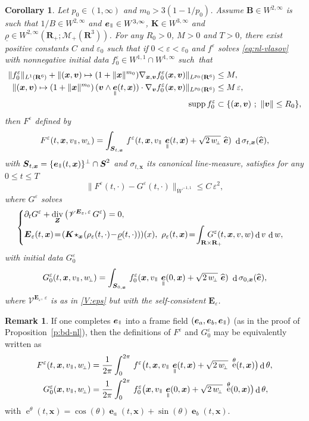 \documentclass[10pt]{amsart}
\let\mathcal\mathscr
\newenvironment{splitcases}
{\begin{cases}\begin{aligned}}
{\end{aligned}\end{cases}}
\newcommand{\sperp}{{\scriptscriptstyle\perp}}
\newcommand{\sep}{\ ;\ }
\let\eps\varepsilon
\let\d\partial
\DeclareMathOperator\dD{d}\let\dd\dD
\DeclareMathOperator\eD{e}
\DeclareMathOperator{\Div}{div}
\theoremstyle{plain}
\newtheorem{corollary}[theorem]{Corollary}
\theoremstyle{definition}
\newtheorem{remark}[theorem]{Remark}
\newcommand\br{\begin{remark}}
\newcommand\er{\end{remark}}
\newcommand{\be}{\begin{equation}}
\newcommand{\ee}{\end{equation}}
\newcommand{\bc}{\begin{corollary}}
\newcommand{\ec}{\end{corollary}}
\newcommand\R{\mathbf R}
\newcommand\bB{{\boldsymbol B}}
\newcommand\bE{{\boldsymbol E}}
\newcommand\bK{{\boldsymbol K}}
\newcommand\bS{{\boldsymbol S}}
\newcommand\bfv{{\boldsymbol v}}
\newcommand\bfx{{\boldsymbol x}}
\newcommand\bfZ{{\boldsymbol Z}}
\newcommand\urho{{\underline \rho}}
\newcommand\cM{{\mathcal M}}
\newcommand\cV{{\mathcal V}}
\DeclareMathOperator{\beD}{\boldsymbol{e}}
\newcommand\eDpar{\beD_\mypar}
\newcommand\eDa{\beD_a}
\newcommand\eDb{\beD_b}
\newcommand\eperp{w_{\!\sperp}}
\newcommand{\mypar}{{\mkern3mu\vphantom{\perp}\vrule depth 0pt\mkern2mu\vrule depth 0pt\mkern3mu}}
\begin{document}
\bc
\label{cor:2-nl}
Let $p_0\in(1,\infty)$ and $m_0>3(1-1/p_0)$.
Assume $\bB\in W^{2,\infty}$ is such that $1/B\in W^{2,\infty}$ and $\eDpar\in W^{3,\infty}$, $\bK\in W^{3,\infty}$ and $\urho\in W^{2,\infty}(\R_+;\cM_+(\R^3))$. For any $R_0>0$, $M>0$ and $T>0$, there exist positive constants $C$ and $\eps_0$ such that if $0<\eps<\eps_0$ and $f^\eps$ solves \eqref{eq:nl-vlasov} with nonnegative initial data $f_0^\eps\in W^{1,1}\cap W^{1,\infty}$ such~that
\begin{align*}
\|f_0^\eps\|_{L^1(\R^6)}
+\|(\bfx,\bfv)\mapsto (1+\|\bfx\|^{m_0})\nabla_{\bfx,\bfv}f_0^\eps(\bfx,\bfv)\|_{L^{p_0}(\R^6)}&\leq M,\\
\|(\bfx,\bfv)\mapsto (1+\|\bfx\|^{m_0})\,
(\bfv\wedge\eDpar(t,\bfx))\cdot\nabla_{\bfv}f_0^\eps(\bfx,\bfv)\|_{L^{p_0}(\R^6)}&\leq M\,\eps,\\
\operatorname{supp}f_0^\eps&\subset
\{(\bfx,\bfv)\sep \|\bfv\|\leq R_0\},
\end{align*}
then $F^\eps$ defined by
\[
F^\eps(t,\bfx,v_\mypar,\eperp)=\int_{\bS_{t,\bfx}}\,f^\eps(t,\bfx,v_\mypar\,\eDpar(t,\bfx)+\sqrt{2\,\eperp}\ \widehat{\beD})\ \dD \sigma_{t,\bfx}(\widehat{\beD}),
\]
with $\bS_{t,\bfx}=\{\eDpar(t,\bfx)\}^\perp\cap\bS^2$ and $\sigma_{t,\bfx}$ its canonical line-measure, satisfies for any $0\leq t\leq T$
\[
\|F^\eps(t,\cdot)-G^\eps(t,\cdot)\|_{\dot{W}^{-1,1}}\leq C\,\eps^2,
\]
where $G^\eps$ solves
\be
\begin{splitcases}
&\d_t G^\eps+\Div_\bfZ \left(\cV^{\bE_\eps,\,\eps}\,G^\eps \right) =0,\\
&\bE_\eps(t,\bfx)\!=\!(\bK\!\star_{\bfx}\!(\rho_\eps(t,\cdot)\!-\!\urho(t,\cdot)))(x),\ 
\rho_\eps(t,\bfx)\!=\!\int_{\R\times\R_+}\hspace*{-7mm}G^\eps(t,\bfx,v,w)\dD v\,\dD w,
\end{splitcases}
\ee
with initial data $G_{0}^\eps$
\[
G_0^\eps(t,\bfx,v_\mypar,\eperp)=\int_{\bS_{0,\bfx}}\,f_0^\eps(\bfx,v_\mypar\,\eDpar(0,\bfx)+\sqrt{2\,\eperp}\ \widehat{\beD})\ \dD \sigma_{0,\bfx}(\widehat{\beD}),
\]
where $\cV^{\bE_\eps,\,\eps}$ is as in \eqref{V:eps} but with the self-consistent $\bE_\eps$.
\ec

\br If one completes $\eDpar$ into a frame field $(\eDa,\eDb,\eDpar)$ (as in the proof of Proposition~\ref{p:bd-nl}), then the definitions of $F^\eps$ and $G_0^\eps$ may be equivalently written as
\begin{align*}
F^\eps(t,\bfx,v_\mypar,\eperp)&=\frac{1}{2\pi}\int_0^{2\pi}\,f^\eps\bigl(t,\bfx,v_\mypar\,\eDpar(t,\bfx)+\sqrt{2\,\eperp}\ \eD^\theta(t,\bfx)\bigr) \dD \theta,\\
G_0^\eps(\bfx,v_\mypar,\eperp)&=\frac{1}{2\pi}\int_0^{2\pi}\,f_0^\eps\bigl(\bfx,v_\mypar\,\eDpar(0,\bfx)+\sqrt{2\,\eperp}\ \eD^\theta(0,\bfx)\bigr)\dD \theta,
\end{align*}
with $\eD^\theta(t,\bfx)=\cos(\theta)\eDa(t,\bfx)+\sin(\theta)\eDb(t,\bfx)$.
\er
\end{document}
